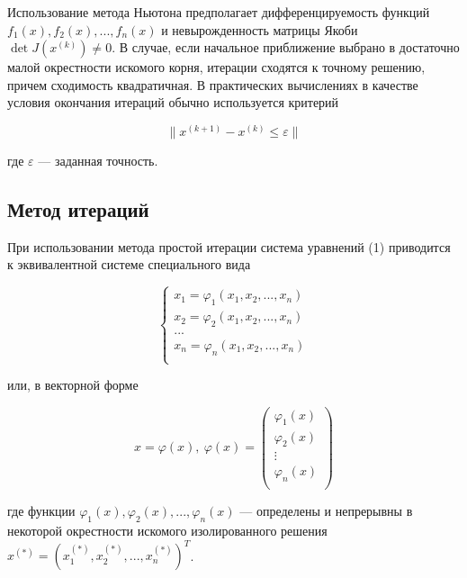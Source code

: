 Использование метода Ньютона предполагает дифференцируемость функций $f_1(x), f_2(x), ..., f_n(x)$ и невырожденность матрицы Якоби
$\det J(x^{(k)}) \neq 0$. В случае, если
начальное приближение выбрано в достаточно малой окрестности искомого корня,
итерации сходятся к точному решению, причем сходимость квадратичная. В практических вычислениях в качестве условия окончания итераций обычно
используется критерий

\begin{equation}\label{eq:pythagoras}
    \| x^{(k + 1)} - x^{(k)} \leq \varepsilon \|
\end{equation}

где $\varepsilon$ --- заданная точность.

\subsection*{Метод итераций}

При использовании метода простой итерации система
уравнений (1) приводится к эквивалентной системе специального вида

\begin{equation}\label{eq:pythagoras}
    \begin{cases}
        x_1 = \varphi_1 (x_1, x_2, ..., x_n) \\
        x_2 = \varphi_2 (x_1, x_2, ..., x_n) \\
        ... \\
        x_n = \varphi_n (x_1, x_2, ..., x_n) \\
    \end{cases}
\end{equation}

или, в векторной форме

\begin{equation}\label{eq:pythagoras}
    x = \varphi (x), \ \varphi (x) = 
    \begin{pmatrix}
        \varphi_1 (x) \\
        \varphi_2 (x) \\
        \vdots \\
        \varphi_n (x) \\
    \end{pmatrix}
\end{equation}

где функции $\varphi_1 (x), \varphi_2 (x), ..., \varphi_n (x)$ --- определены и непрерывны в некоторой окрестности
искомого изолированного решения $x^{(*)} = (x_1^{(*)}, x_2^{(*)}, ..., x_n^{(*)})^T$.


